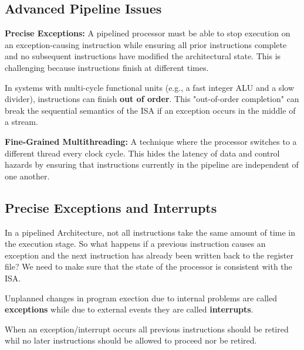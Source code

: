 \subsection{Advanced Pipeline Issues}

\begin{important}
\textbf{Precise Exceptions:} A pipelined processor must be able to stop execution on an exception-causing instruction while ensuring all prior instructions complete and no subsequent instructions have modified the architectural state. This is challenging because instructions finish at different times.
\end{important}

\begin{lemma}
In systems with multi-cycle functional units (e.g., a fast integer ALU and a slow divider), instructions can finish \textbf{out of order}. This "out-of-order completion" can break the sequential semantics of the ISA if an exception occurs in the middle of a stream.
\end{lemma}

\begin{definition}
\textbf{Fine-Grained Multithreading:} A technique where the processor switches to a different thread every clock cycle. This hides the latency of data and control hazards by ensuring that instructions currently in the pipeline are independent of one another.
\end{definition}


\subsection{Precise Exceptions and Interrupts}

In a pipelined Architecture, not all instructions take the same amount of time in the execution stage. 
So what happens if a previous instruction causes an exception and the next instruction has already been written back to the register file? 
We need to make sure that the state of the processor is consistent with the ISA. 

\begin{definition}
    Unplanned changes in program exection due to internal problems are called \textbf{exceptions} while due to external events they are called \textbf{interrupts}.
\end{definition}

\begin{important}
    When an exception/interrupt occurs all previous instructions should be retired whil no later instructions should be allowed to proceed nor be retired.
\end{important}

